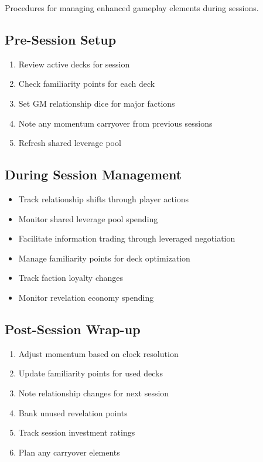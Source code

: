 Procedures for managing enhanced gameplay elements during sessions.

\subsection{Pre-Session Setup}

\begin{enumerate}
\item Review active decks for session
\item Check familiarity points for each deck
\item Set GM relationship dice for major factions
\item Note any momentum carryover from previous sessions
\item Refresh shared leverage pool
\end{enumerate}

\subsection{During Session Management}

\begin{itemize}
\item Track relationship shifts through player actions
\item Monitor shared leverage pool spending
\item Facilitate information trading through leveraged negotiation
\item Manage familiarity points for deck optimization
\item Track faction loyalty changes
\item Monitor revelation economy spending
\end{itemize}

\subsection{Post-Session Wrap-up}

\begin{enumerate}
\item Adjust momentum based on clock resolution
\item Update familiarity points for used decks
\item Note relationship changes for next session
\item Bank unused revelation points
\item Track session investment ratings
\item Plan any carryover elements
\end{enumerate}

